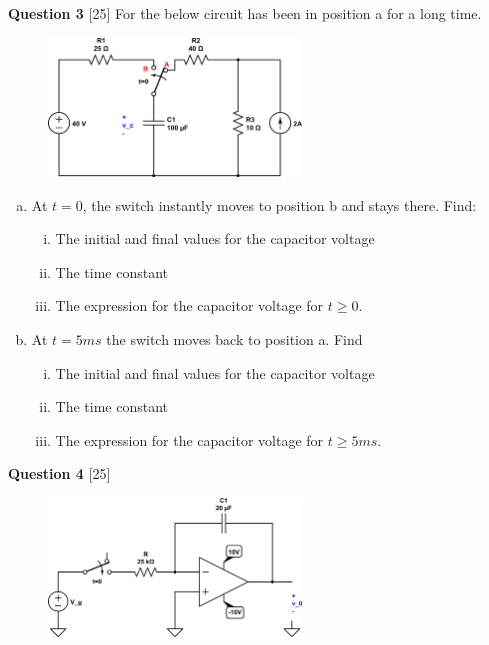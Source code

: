 \documentclass[12pt]{article}
\begin{document}
\newpage
{\bf Question 3} [25] 
\newline
For the below circuit has been in position a for a long time. 

\begin{figure}[h!]
     \centering
       \includegraphics[clip,width=0.6\textwidth]{mid2_3.png}
\end{figure}

\begin{enumerate}[(a)]
\item At $t=0$, the switch instantly moves to position b and stays there. Find:
\begin{enumerate}[(i)]
\item The initial and final values for the capacitor voltage
\item The time constant
\item The expression for the capacitor voltage for $t \geq 0$.
\end{enumerate}
\item At $t = 5ms$ the switch moves back to position a. Find
\begin{enumerate}[(i)]
\item The initial and final values for the capacitor voltage
\item The time constant
\item The expression for the capacitor voltage for $t \geq 5 ms$.
\end{enumerate}

\end{enumerate}

\newpage
{\bf Question 4} [25] 
\newline

\begin{figure}[!h]
  \centering 
  \includegraphics[clip,width=0.6\textwidth]{mid2_4.png}
\end{figure}
\end{document}
